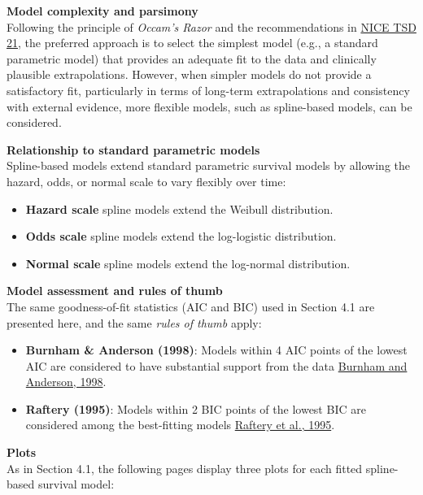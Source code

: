 \documentclass[
]{article}
\providecommand{\tightlist}{%
  \setlength{\itemsep}{0pt}\setlength{\parskip}{0pt}}
\begin{document}
\textbf{Model complexity and parsimony}\\
Following the principle of \emph{Occam's Razor} and the recommendations
in
\href{https://www.sheffield.ac.uk/media/34188/download?attachment}{NICE
TSD 21}, the preferred approach is to select the simplest model (e.g., a
standard parametric model) that provides an adequate fit to the data and
clinically plausible extrapolations. However, when simpler models do not
provide a satisfactory fit, particularly in terms of long-term
extrapolations and consistency with external evidence, more flexible
models, such as spline-based models, can be considered.

\textbf{Relationship to standard parametric models}\\
Spline-based models extend standard parametric survival models by
allowing the hazard, odds, or normal scale to vary flexibly over time:

\begin{itemize}
\tightlist
\item
  \textbf{Hazard scale} spline models extend the Weibull distribution.\\
\item
  \textbf{Odds scale} spline models extend the log-logistic
  distribution.\\
\item
  \textbf{Normal scale} spline models extend the log-normal
  distribution.
\end{itemize}

\textbf{Model assessment and rules of thumb}\\
The same goodness-of-fit statistics (AIC and BIC) used in Section 4.1
are presented here, and the same \emph{rules of thumb} apply:

\begin{itemize}
\tightlist
\item
  \textbf{Burnham \& Anderson (1998)}: Models within 4 AIC points of the
  lowest AIC are considered to have substantial support from the data
  \href{https://doi.org/10.1007/978-1-4757-2917-7}{Burnham and Anderson,
  1998}.\\
\item
  \textbf{Raftery (1995)}: Models within 2 BIC points of the lowest BIC
  are considered among the best-fitting models
  \href{https://doi.org/10.2307/271063}{Raftery et al., 1995}.
\end{itemize}

\textbf{Plots}\\
As in Section 4.1, the following pages display three plots for each
fitted spline-based survival model:
\end{document}
